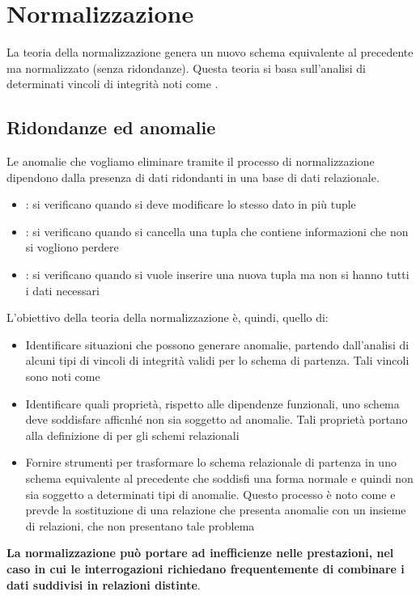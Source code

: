 \documentclass[12pt, a4paper]{report}
\begin{document}
    \chapter{Normalizzazione}
    La teoria della normalizzazione genera un nuovo schema equivalente al precedente ma normalizzato (senza ridondanze). Questa teoria si basa sull'analisi di determinati vincoli di integrità noti come .
    \section{Ridondanze ed anomalie}
    Le anomalie che vogliamo eliminare tramite il processo di normalizzazione dipendono dalla presenza di dati ridondanti in una base di dati relazionale.
    \begin{itemize}
        \item {}: si verificano quando si deve modificare lo stesso dato in più tuple
        \item {}: si verificano quando si cancella una tupla che contiene informazioni che non si vogliono perdere
        \item {}: si verificano quando si vuole inserire una nuova tupla ma non si hanno tutti i dati necessari
    \end{itemize}
    L'obiettivo della teoria della normalizzazione è, quindi, quello di:
    \begin{itemize}
        \item Identificare situazioni che possono generare anomalie, partendo dall'analisi di alcuni tipi di vincoli di integrità validi per lo schema di partenza. Tali vincoli sono noti come 
        \item Identificare quali proprietà, rispetto alle dipendenze funzionali, uno schema deve soddisfare afficnhé non sia soggetto ad anomalie. Tali proprietà portano alla definizione di  per gli schemi relazionali
        \item Fornire strumenti per trasformare lo schema relazionale di partenza in uno schema equivalente al precedente che soddisfi una forma normale e quindi non sia soggetto a determinati tipi di anomalie. Questo processo è noto come  e prevde la sostituzione di una relazione che presenta anomalie con un insieme di relazioni, che non presentano tale problema
    \end{itemize}
    \textbf{La normalizzazione può portare ad inefficienze nelle prestazioni, nel caso in cui le interrogazioni richiedano frequentemente di combinare i dati suddivisi in relazioni distinte}.
\end{document}
